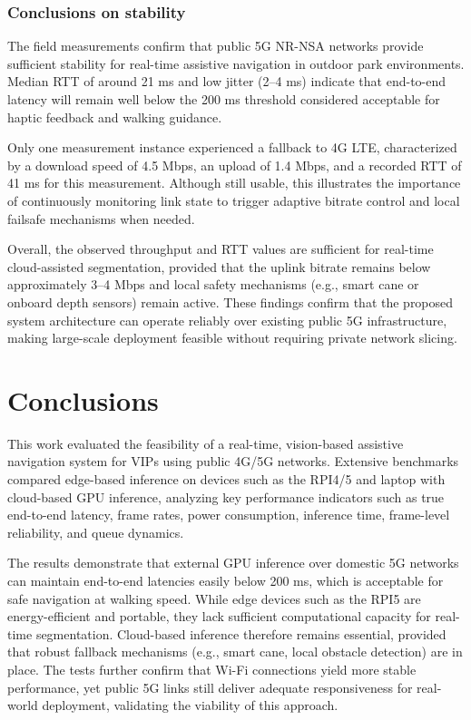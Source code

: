 \documentclass{ieeeaccess}
\begin{document}
\subsubsection{Conclusions on stability}
The field measurements confirm that public 5G NR-NSA networks provide sufficient stability for real-time assistive navigation in outdoor park environments. Median RTT of around 21 ms and low jitter (2–4 ms) indicate that end-to-end latency will remain well below the 200 ms threshold considered acceptable for haptic feedback and walking guidance.  

Only one measurement instance experienced a fallback to 4G LTE, characterized by a download speed of 4.5 Mbps, an upload of 1.4 Mbps, and a recorded RTT of 41 ms for this measurement. Although still usable, this illustrates the importance of continuously monitoring link state to trigger adaptive bitrate control and local failsafe mechanisms when needed.  

Overall, the observed throughput and RTT values are sufficient for real-time cloud-assisted segmentation, provided that the uplink bitrate remains below approximately 3–4 Mbps and local safety mechanisms (e.g., smart cane or onboard depth sensors) remain active.  
These findings confirm that the proposed system architecture can operate reliably over existing public 5G infrastructure, making large-scale deployment feasible without requiring private network slicing.




\section{Conclusions}
This work evaluated the feasibility of a real-time, vision-based assistive navigation system for VIPs using public 4G/5G networks. Extensive benchmarks compared edge-based inference on devices such as the RPI4/5 and laptop with cloud-based GPU inference, analyzing key performance indicators such as true end-to-end latency, frame rates, power consumption, inference time, frame-level reliability, and queue dynamics.  

The results demonstrate that external GPU inference over domestic 5G networks can maintain end-to-end latencies easily below 200 ms, which is acceptable for safe navigation at walking speed. While edge devices such as the RPI5 are energy-efficient and portable, they lack sufficient computational capacity for real-time segmentation. Cloud-based inference therefore remains essential, provided that robust fallback mechanisms (e.g., smart cane, local obstacle detection) are in place. The tests further confirm that Wi-Fi connections yield more stable performance, yet public 5G links still deliver adequate responsiveness for real-world deployment, validating the viability of this approach.  
\end{document}
